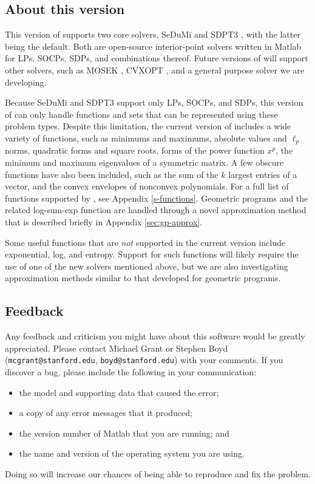 \documentclass[12pt]{article}
\begin{document}
\subsection{About this version}
\label{sec:version}
This version of \cvx supports two core solvers, SeDuMi
\cite{Stu:99} and SDPT3 \cite{SDPT3}, with the latter being the default.
Both are open-source interior-point solvers written in Matlab for 
LPs, SOCPs, SDPs, and combinations thereof.
Future versions of \cvx will support other solvers, such as
MOSEK \cite{MOSEK}, CVXOPT \cite{CVXOPT}, 
and a general purpose solver we are developing.

Because SeDuMi and SDPT3 support only LPs, SOCPs, and SDPs, this
version of \cvx can only handle functions and sets that can be represented
using these problem types. Despite this limitation, the current version
of \cvx includes a wide variety of functions, such as minimums and
maximums, absolute values and $\ell_p$ norms, quadratic forms and square roots,
forms of the power function $x^p$, the minimum and maximum eigenvalues
of a symmetric matrix. A few obscure functions have also been included, 
such as  the sum of the $k$ largest entries of a vector, and the
convex envelopes of nonconvex polynomials.
For a full list of functions supported by \cvx, 
see Appendix \ref{s-functions}. 
Geometric programs and the related log-sum-exp function
are handled through a novel approximation
method that is described briefly in Appendix \ref{sec:gp-approx}.

Some useful functions that are \emph{not} supported in
the current version include exponential, log, and entropy.
Support for such functions will likely require the use
of one of the new solvers mentioned above, but we are also
investigating approximation methods similar to that developed
for geometric programs.

\subsection{Feedback}
\label{sec:feedback}

Any feedback and criticism you might
have about this software would be greatly appreciated.
Please contact Michael Grant or Stephen Boyd 
(\texttt{mcgrant@stanford.edu}, \texttt{boyd@stanford.edu}) with your comments. If
you discover a bug, please include the following in your communication:
\begin{itemize}
\item the \cvx model and supporting data that caused the error;
\item a copy of any error messages that it produced;
\item the version number of Matlab that you are running; and
\item the name and version of the operating system you are using.
\end{itemize}
Doing so will increase our chances of being able to reproduce and fix the problem.
\end{document}
